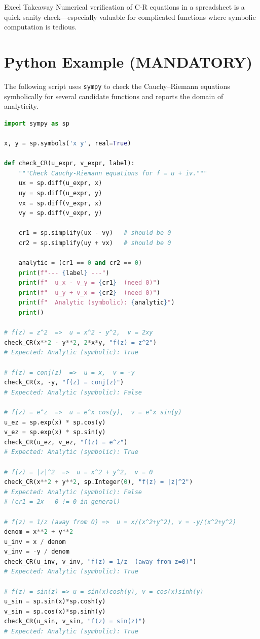 \documentclass[12pt,a4paper]{article}
\begin{document}
\begin{learnbox}{Excel Takeaway}
Numerical verification of C-R equations in a spreadsheet is a quick sanity check---especially valuable for complicated functions where symbolic computation is tedious.
\end{learnbox}

\section{Python Example (MANDATORY)}

The following script uses \texttt{sympy} to check the Cauchy--Riemann equations
symbolically for several candidate functions and reports the domain of analyticity.

\begin{lstlisting}[language=Python, caption={Analyticity test using SymPy}]
import sympy as sp

x, y = sp.symbols('x y', real=True)

def check_CR(u_expr, v_expr, label):
    """Check Cauchy-Riemann equations for f = u + iv."""
    ux = sp.diff(u_expr, x)
    uy = sp.diff(u_expr, y)
    vx = sp.diff(v_expr, x)
    vy = sp.diff(v_expr, y)

    cr1 = sp.simplify(ux - vy)   # should be 0
    cr2 = sp.simplify(uy + vx)   # should be 0

    analytic = (cr1 == 0 and cr2 == 0)
    print(f"--- {label} ---")
    print(f"  u_x - v_y = {cr1}  (need 0)")
    print(f"  u_y + v_x = {cr2}  (need 0)")
    print(f"  Analytic (symbolic): {analytic}")
    print()

# f(z) = z^2  =>  u = x^2 - y^2,  v = 2xy
check_CR(x**2 - y**2, 2*x*y, "f(z) = z^2")
# Expected: Analytic (symbolic): True

# f(z) = conj(z)  =>  u = x,  v = -y
check_CR(x, -y, "f(z) = conj(z)")
# Expected: Analytic (symbolic): False

# f(z) = e^z  =>  u = e^x cos(y),  v = e^x sin(y)
u_ez = sp.exp(x) * sp.cos(y)
v_ez = sp.exp(x) * sp.sin(y)
check_CR(u_ez, v_ez, "f(z) = e^z")
# Expected: Analytic (symbolic): True

# f(z) = |z|^2  =>  u = x^2 + y^2,  v = 0
check_CR(x**2 + y**2, sp.Integer(0), "f(z) = |z|^2")
# Expected: Analytic (symbolic): False
# (cr1 = 2x - 0 != 0 in general)

# f(z) = 1/z (away from 0) =>  u = x/(x^2+y^2), v = -y/(x^2+y^2)
denom = x**2 + y**2
u_inv = x / denom
v_inv = -y / denom
check_CR(u_inv, v_inv, "f(z) = 1/z  (away from z=0)")
# Expected: Analytic (symbolic): True

# f(z) = sin(z) => u = sin(x)cosh(y), v = cos(x)sinh(y)
u_sin = sp.sin(x)*sp.cosh(y)
v_sin = sp.cos(x)*sp.sinh(y)
check_CR(u_sin, v_sin, "f(z) = sin(z)")
# Expected: Analytic (symbolic): True
\end{lstlisting}
\end{document}
